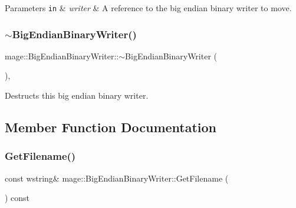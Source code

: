 \begin{DoxyParams}[1]{Parameters}
\mbox{\tt in}  & {\em writer} & A reference to the big endian binary writer to move. \\
\hline
\end{DoxyParams}
\hypertarget{classmage_1_1_big_endian_binary_writer_ab717bcbfc15ba4a1cb25eeb564e120b8}{}\label{classmage_1_1_big_endian_binary_writer_ab717bcbfc15ba4a1cb25eeb564e120b8} 
\subsubsection{\texorpdfstring{$\sim$\+Big\+Endian\+Binary\+Writer()}{~BigEndianBinaryWriter()}}
{\footnotesize\ttfamily mage\+::\+Big\+Endian\+Binary\+Writer\+::$\sim$\+Big\+Endian\+Binary\+Writer (\begin{DoxyParamCaption}{ }\end{DoxyParamCaption})\hspace{0.3cm}{\ttfamily [protected]}, {\ttfamily [default]}}

Destructs this big endian binary writer. 

\subsection{Member Function Documentation}
\hypertarget{classmage_1_1_big_endian_binary_writer_a61a80be19c7b59ff5803e51401e8f646}{}\label{classmage_1_1_big_endian_binary_writer_a61a80be19c7b59ff5803e51401e8f646} 
\subsubsection{\texorpdfstring{Get\+Filename()}{GetFilename()}}
{\footnotesize\ttfamily const wstring\& mage\+::\+Big\+Endian\+Binary\+Writer\+::\+Get\+Filename (\begin{DoxyParamCaption}{ }\end{DoxyParamCaption}) const\hspace{0.3cm}{\ttfamily [noexcept]}}

